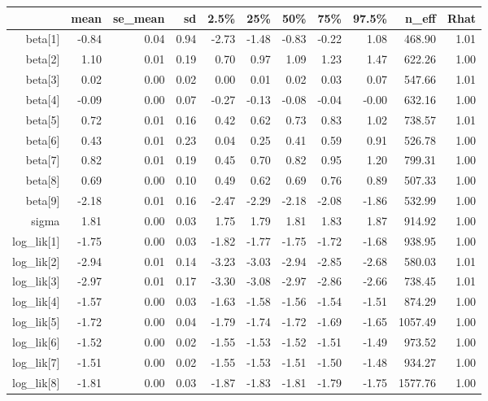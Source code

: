 \begin{table}[ht]
\centering
\begin{tabular}{rrrrrrrrrrr}
  \hline
 & mean & se\_mean & sd & 2.5\% & 25\% & 50\% & 75\% & 97.5\% & n\_eff & Rhat \\ 
  \hline
beta[1] & -0.84 & 0.04 & 0.94 & -2.73 & -1.48 & -0.83 & -0.22 & 1.08 & 468.90 & 1.01 \\ 
  beta[2] & 1.10 & 0.01 & 0.19 & 0.70 & 0.97 & 1.09 & 1.23 & 1.47 & 622.26 & 1.00 \\ 
  beta[3] & 0.02 & 0.00 & 0.02 & 0.00 & 0.01 & 0.02 & 0.03 & 0.07 & 547.66 & 1.01 \\ 
  beta[4] & -0.09 & 0.00 & 0.07 & -0.27 & -0.13 & -0.08 & -0.04 & -0.00 & 632.16 & 1.00 \\ 
  beta[5] & 0.72 & 0.01 & 0.16 & 0.42 & 0.62 & 0.73 & 0.83 & 1.02 & 738.57 & 1.01 \\ 
  beta[6] & 0.43 & 0.01 & 0.23 & 0.04 & 0.25 & 0.41 & 0.59 & 0.91 & 526.78 & 1.00 \\ 
  beta[7] & 0.82 & 0.01 & 0.19 & 0.45 & 0.70 & 0.82 & 0.95 & 1.20 & 799.31 & 1.00 \\ 
  beta[8] & 0.69 & 0.00 & 0.10 & 0.49 & 0.62 & 0.69 & 0.76 & 0.89 & 507.33 & 1.00 \\ 
  beta[9] & -2.18 & 0.01 & 0.16 & -2.47 & -2.29 & -2.18 & -2.08 & -1.86 & 532.99 & 1.00 \\ 
  sigma & 1.81 & 0.00 & 0.03 & 1.75 & 1.79 & 1.81 & 1.83 & 1.87 & 914.92 & 1.00 \\ 
  log\_lik[1] & -1.75 & 0.00 & 0.03 & -1.82 & -1.77 & -1.75 & -1.72 & -1.68 & 938.95 & 1.00 \\ 
  log\_lik[2] & -2.94 & 0.01 & 0.14 & -3.23 & -3.03 & -2.94 & -2.85 & -2.68 & 580.03 & 1.01 \\ 
  log\_lik[3] & -2.97 & 0.01 & 0.17 & -3.30 & -3.08 & -2.97 & -2.86 & -2.66 & 738.45 & 1.01 \\ 
  log\_lik[4] & -1.57 & 0.00 & 0.03 & -1.63 & -1.58 & -1.56 & -1.54 & -1.51 & 874.29 & 1.00 \\ 
  log\_lik[5] & -1.72 & 0.00 & 0.04 & -1.79 & -1.74 & -1.72 & -1.69 & -1.65 & 1057.49 & 1.00 \\ 
  log\_lik[6] & -1.52 & 0.00 & 0.02 & -1.55 & -1.53 & -1.52 & -1.51 & -1.49 & 973.52 & 1.00 \\ 
  log\_lik[7] & -1.51 & 0.00 & 0.02 & -1.55 & -1.53 & -1.51 & -1.50 & -1.48 & 934.27 & 1.00 \\ 
  log\_lik[8] & -1.81 & 0.00 & 0.03 & -1.87 & -1.83 & -1.81 & -1.79 & -1.75 & 1577.76 & 1.00 \\ 

\end{tabular}
\end{table}
